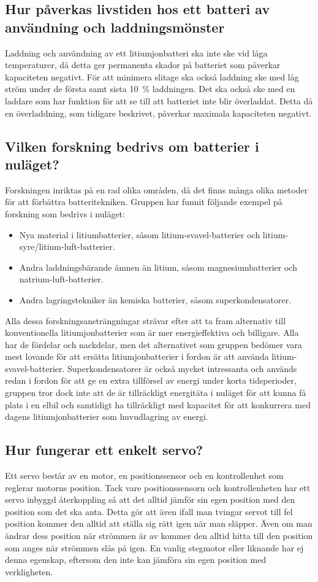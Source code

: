 \documentclass[a4paper,12pt]{article}
\begin{document}
\subsection{Hur påverkas livstiden hos ett batteri av användning och laddningsmönster}
Laddning och användning av ett litiumjonbatteri ska inte ske vid låga temperaturer, då detta ger permanenta skador på batteriet som påverkar kapaciteten negativt. För att minimera slitage ska också laddning ske med låg ström under de första samt sista 10~\% laddningen. Det ska också ske med en laddare som har funktion för att se till att batteriet inte blir överladdat. Detta då en överladdning, som tidigare beskrivet, påverkar maximala kapaciteten negativt.

\subsection{Vilken forskning bedrivs om batterier i nuläget?}
Forskningen inriktas på en rad olika områden, då det finns många olika metoder för att förbättra batteritekniken. Gruppen har funnit följande exempel på forskning som bedrivs i nuläget:
\begin{itemize}
\item Nya material i litiumbatterier, såsom litium-svavel-batterier och litium-syre/litium-luft-batterier.
\item Andra laddningsbärande ämnen än litium, såsom magnesiumbatterier och natrium-luft-batterier.
\item Andra lagringstekniker än kemiska batterier, såsom superkondensatorer.
\end{itemize}
Alla dessa forskningsansträngningar strävar efter att ta fram alternativ till konventionella litiumjonbatterier som är mer energieffektiva och billigare. Alla har de fördelar och nackdelar, men det alternativet som gruppen bedömer vara mest lovande för att ersätta litiumjonbatterier i fordon är att använda litium-svavel-batterier. Superkondensatorer är också mycket intressanta och används redan i fordon för att ge en extra tillförsel av energi under korta tidsperioder, gruppen tror dock inte att de är tillräckligt energitäta i nuläget för att kunna få plats i en elbil och samtidigt ha tillräckligt med kapacitet för att konkurrera med dagens litiumjonbatterier som huvudlagring av energi. 

\subsection{Hur fungerar ett enkelt servo?}
Ett servo består av en motor, en positionssensor och en kontrollenhet som reglerar motorns position. Tack vare positionssensorn och kontrollenheten har ett servo inbyggd återkoppling så att det alltid jämför sin egen position med den position som det ska anta. Detta gör att även ifall man tvingar servot till fel position kommer den alltid att ställa sig rätt igen när man släpper. Även om man ändrar dess position när strömmen är av kommer den alltid hitta till den position som anges när strömmen slås på igen. En vanlig stegmotor eller liknande har ej denna egenskap, eftersom den inte kan jämföra sin egen position med verkligheten.
\end{document}
